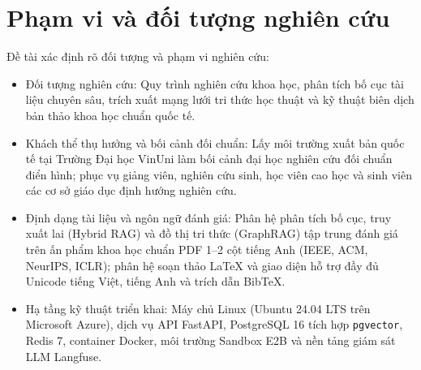 \section{Phạm vi và đối tượng nghiên cứu}
\label{sec:pham_vi}
Đề tài xác định rõ đối tượng và phạm vi nghiên cứu:
\begin{itemize}
    \item Đối tượng nghiên cứu: Quy trình nghiên cứu khoa học, phân tích bố cục tài liệu chuyên sâu, trích xuất mạng lưới tri thức học thuật và kỹ thuật biên dịch bản thảo khoa học chuẩn quốc tế.
    \item Khách thể thụ hưởng và bối cảnh đối chuẩn: Lấy môi trường xuất bản quốc tế tại Trường Đại học VinUni làm bối cảnh đại học nghiên cứu đối chuẩn điển hình; phục vụ giảng viên, nghiên cứu sinh, học viên cao học và sinh viên các cơ sở giáo dục định hướng nghiên cứu.
    \item Định dạng tài liệu và ngôn ngữ đánh giá: Phân hệ phân tích bố cục, truy xuất lai (Hybrid RAG) và đồ thị tri thức (GraphRAG) tập trung đánh giá trên ấn phẩm khoa học chuẩn PDF 1--2 cột tiếng Anh (IEEE, ACM, NeurIPS, ICLR); phân hệ soạn thảo LaTeX và giao diện hỗ trợ đầy đủ Unicode tiếng Việt, tiếng Anh và trích dẫn BibTeX.
    \item Hạ tầng kỹ thuật triển khai: Máy chủ Linux (Ubuntu 24.04 LTS trên Microsoft Azure), dịch vụ API FastAPI, PostgreSQL 16 tích hợp \texttt{pgvector}, Redis 7, container Docker, môi trường Sandbox E2B và nền tảng giám sát LLM Langfuse.
\end{itemize}
